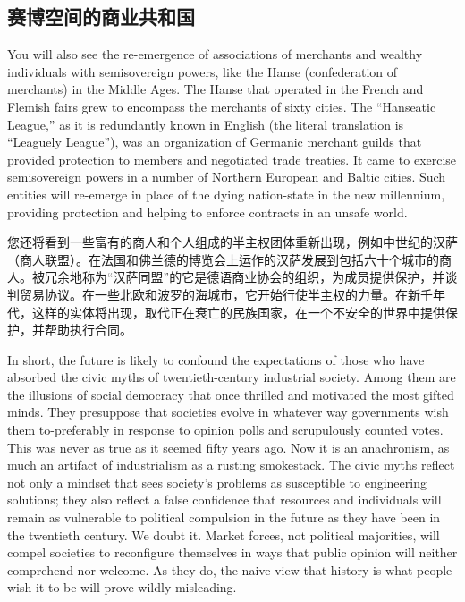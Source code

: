 \subsection{赛博空间的商业共和国}
\begin{paracol}{2}
	You will also see the re-emergence of associations of merchants and wealthy individuals with semisovereign powers, like the Hanse (confederation of merchants) in the Middle Ages. The Hanse that operated in the French and Flemish fairs grew to encompass the merchants of sixty cities. The ``Hanseatic League,'' as it is redundantly known in English (the literal translation is ``Leaguely League''), was an organization of Germanic merchant guilds that provided protection to members and negotiated trade treaties. It came to exercise\\ semisovereign powers in a number of Northern European and Baltic cities. Such entities will re-emerge in place of the dying nation-state in the new millennium, providing protection and helping to enforce contracts in an unsafe world.
	
	\switchcolumn
	您还将看到一些富有的商人和个人组成的半主权团体重新出现，例如中世纪的汉萨（商人联盟）。在法国和佛兰德的博览会上运作的汉萨发展到包括六十个城市的商人。被冗余地称为“汉萨同盟”的它是德语商业协会的组织，为成员提供保护，并谈判贸易协议。在一些北欧和波罗的海城市，它开始行使半主权的力量。在新千年代，这样的实体将出现，取代正在衰亡的民族国家，在一个不安全的世界中提供保护，并帮助执行合同。
	
	\switchcolumn*
	In short, the future is likely to confound the expectations of those who have absorbed the civic myths of twentieth-century industrial society. Among them are the illusions of social democracy that once thrilled and motivated the most gifted minds. They presuppose that societies evolve in whatever way governments wish them to-preferably in response to opinion polls and scrupulously counted votes. This was never as true as it seemed fifty years ago. Now it is an anachronism, as much an artifact of industrialism as a rusting smokestack. The civic myths reflect not only a mindset that sees society's problems as susceptible to engineering solutions; they also reflect a false confidence that resources and individuals will remain as vulnerable to political compulsion in the future as they have been in the twentieth century. We doubt it. Market forces, not political majorities, will compel societies to reconfigure themselves in ways that public opinion will neither comprehend nor welcome. As they do, the naive view that history is what people wish it to be will prove wildly misleading. 
	

\end{paracol}
